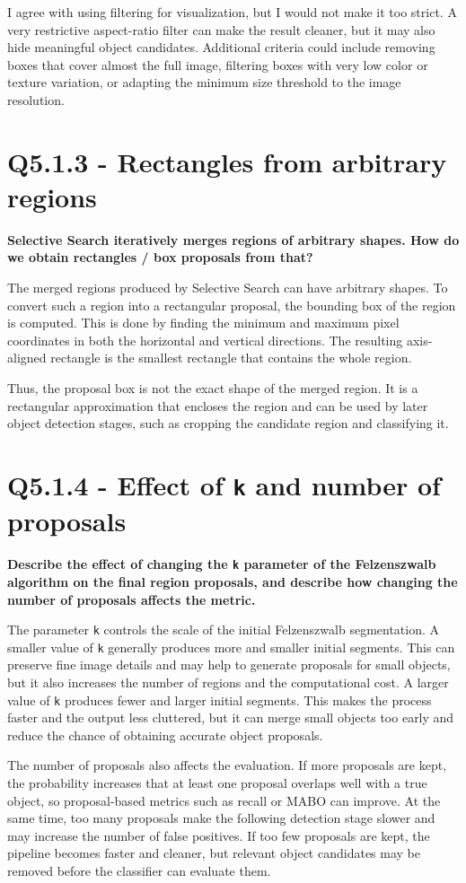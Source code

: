 \documentclass[11pt,a4paper]{article}
\begin{document}
I agree with using filtering for visualization, but I would not make it too strict. A very restrictive aspect-ratio filter can make the result cleaner, but it may also hide meaningful object candidates. Additional criteria could include removing boxes that cover almost the full image, filtering boxes with very low color or texture variation, or adapting the minimum size threshold to the image resolution.

\section*{Q5.1.3 - Rectangles from arbitrary regions}
\textbf{Selective Search iteratively merges regions of arbitrary shapes. How do we obtain rectangles / box proposals from that?}

The merged regions produced by Selective Search can have arbitrary shapes. To convert such a region into a rectangular proposal, the bounding box of the region is computed. This is done by finding the minimum and maximum pixel coordinates in both the horizontal and vertical directions. The resulting axis-aligned rectangle is the smallest rectangle that contains the whole region.

Thus, the proposal box is not the exact shape of the merged region. It is a rectangular approximation that encloses the region and can be used by later object detection stages, such as cropping the candidate region and classifying it.

\section*{Q5.1.4 - Effect of \texttt{k} and number of proposals}
\textbf{Describe the effect of changing the \texttt{k} parameter of the Felzenszwalb algorithm on the final region proposals, and describe how changing the number of proposals affects the metric.}

The parameter \texttt{k} controls the scale of the initial Felzenszwalb segmentation. A smaller value of \texttt{k} generally produces more and smaller initial segments. This can preserve fine image details and may help to generate proposals for small objects, but it also increases the number of regions and the computational cost. A larger value of \texttt{k} produces fewer and larger initial segments. This makes the process faster and the output less cluttered, but it can merge small objects too early and reduce the chance of obtaining accurate object proposals.

The number of proposals also affects the evaluation. If more proposals are kept, the probability increases that at least one proposal overlaps well with a true object, so proposal-based metrics such as recall or MABO can improve. At the same time, too many proposals make the following detection stage slower and may increase the number of false positives. If too few proposals are kept, the pipeline becomes faster and cleaner, but relevant object candidates may be removed before the classifier can evaluate them.
\end{document}
